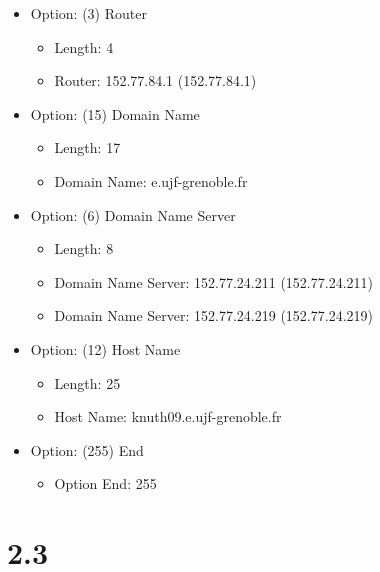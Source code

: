 \documentclass{article}
\begin{document}
\begin{itemize}
	\item  Option: (3) Router
	\begin{itemize}
		\item Length: 4
		\item Router: 152.77.84.1 (152.77.84.1)
	\end{itemize}
	\item  Option: (15) Domain Name
	\begin{itemize}
		\item Length: 17
		\item Domain Name: e.ujf-grenoble.fr
	\end{itemize}
	\item  Option: (6) Domain Name Server
	\begin{itemize}
		\item Length: 8
		\item Domain Name Server: 152.77.24.211 (152.77.24.211)
		\item Domain Name Server: 152.77.24.219 (152.77.24.219)
	\end{itemize}
	\item Option: (12) Host Name
	\begin{itemize}
		\item Length: 25
		\item Host Name: knuth09.e.ujf-grenoble.fr
	\end{itemize}
	\item Option: (255) End
	\begin{itemize}
		\item Option End: 255
	\end{itemize}
	

\end{itemize}

\section*{2.3 }
\end{document}
